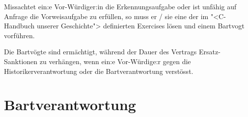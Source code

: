 \documentclass[fontsize=12pt,parskip=half]{scrartcl}
\begin{document}
\begin{contract}
  \Clause[title={Sanktionen}]\label{H.sanktionen}
  Missachtet ein:e Vor-Würdiger:in die Erkennungsaufgabe  oder ist unfähig auf Anfrage die Vorweisaufgabe  zu erfüllen,
  so muss er / sie eine der im "<C-Handbuch unserer Geschichte"> definierten Exercises lösen und einem Bartvogt vorführen.

  Die Bartvögte sind ermächtigt, während der Dauer des Vertrags Ersatz-Sanktionen zu verhängen, wenn ein:e Vor-Würdige:r gegen die Historikerverantwortung 
  oder die Bartverantwortung  verstösst.

\end{contract}

\pagebreak
\section{Bartverantwortung}
\end{document}
